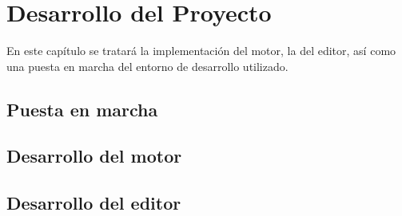 \chapter{Desarrollo del Proyecto}
\label{cap:desarrollo}

\begin{resumen}
En este capítulo se tratará la implementación del motor, la del editor, así como una puesta en marcha del entorno de desarrollo utilizado.
\end{resumen}

\section{Puesta en marcha}


\section{Desarrollo del motor}

\section{Desarrollo del editor}
